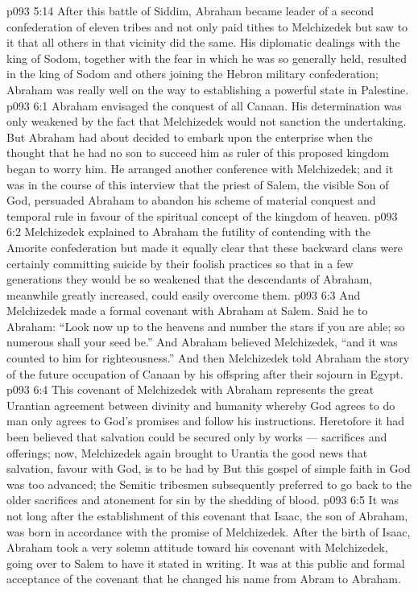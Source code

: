 \vs p093 5:14 After this battle of Siddim, Abraham became leader of a second confederation of eleven tribes and not only paid tithes to Melchizedek but saw to it that all others in that vicinity did the same. His diplomatic dealings with the king of Sodom, together with the fear in which he was so generally held, resulted in the king of Sodom and others joining the Hebron military confederation; Abraham was really well on the way to establishing a powerful state in Palestine.
\vs p093 6:1 Abraham envisaged the conquest of all Canaan. His determination was only weakened by the fact that Melchizedek would not sanction the undertaking. But Abraham had about decided to embark upon the enterprise when the thought that he had no son to succeed him as ruler of this proposed kingdom began to worry him. He arranged another conference with Melchizedek; and it was in the course of this interview that the priest of Salem, the visible Son of God, persuaded Abraham to abandon his scheme of material conquest and temporal rule in favour of the spiritual concept of the kingdom of heaven.
\vs p093 6:2 Melchizedek explained to Abraham the futility of contending with the Amorite confederation but made it equally clear that these backward clans were certainly committing suicide by their foolish practices so that in a few generations they would be so weakened that the descendants of Abraham, meanwhile greatly increased, could easily overcome them.
\vs p093 6:3 And Melchizedek made a formal covenant with Abraham at Salem. Said he to Abraham: “Look now up to the heavens and number the stars if you are able; so numerous shall your seed be.” And Abraham believed Melchizedek, “and it was counted to him for righteousness.” And then Melchizedek told Abraham the story of the future occupation of Canaan by his offspring after their sojourn in Egypt.
\vs p093 6:4 \pc This covenant of Melchizedek with Abraham represents the great Urantian agreement between divinity and humanity whereby God agrees to do  man only agrees to  God’s promises and follow his instructions. Heretofore it had been believed that salvation could be secured only by works --- sacrifices and offerings; now, Melchizedek again brought to Urantia the good news that salvation, favour with God, is to be had by  But this gospel of simple faith in God was too advanced; the Semitic tribesmen subsequently preferred to go back to the older sacrifices and atonement for sin by the shedding of blood.
\vs p093 6:5 It was not long after the establishment of this covenant that Isaac, the son of Abraham, was born in accordance with the promise of Melchizedek. After the birth of Isaac, Abraham took a very solemn attitude toward his covenant with Melchizedek, going over to Salem to have it stated in writing. It was at this public and formal acceptance of the covenant that he changed his name from Abram to Abraham.
